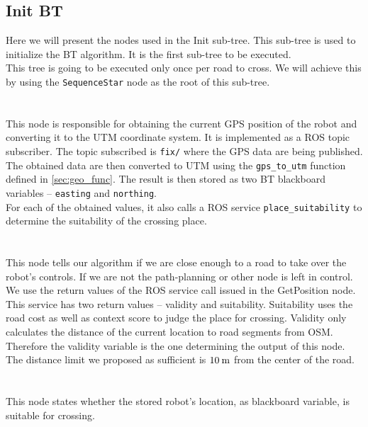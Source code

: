 \subsection{Init BT}
\label{sec:Init-BT-impl}
    Here we will present the nodes used in the Init sub-tree. This sub-tree is used to initialize the BT algorithm. It is the first sub-tree to be executed.\\
    This tree is going to be executed only once per road to cross. We will achieve this by using the \texttt{SequenceStar} node as the root of this sub-tree.\\\\
    \\
        This node is responsible for obtaining the current GPS position of the robot and converting it to the UTM coordinate system. It is implemented as a ROS topic subscriber. The topic subscribed is \texttt{fix/} where the GPS data are being published.\\
        The obtained data are then converted to UTM using the \texttt{gps\_to\_utm} function defined in \ref{sec:geo_func}. The result is then stored as two BT blackboard variables -- \texttt{easting} and \texttt{northing}.\\
        For each of the obtained values, it also calls a ROS service \texttt{place\_suitability} to determine the suitability of the crossing place.\\\\
    \\
        This node tells our algorithm if we are close enough to a road to take over the robot's controls. If we are not the path-planning or other node is left in control.\\
        We use the return values of the ROS service call issued in the GetPosition node. This service has two return values -- validity and suitability. Suitability uses the road cost as well as context score to judge the place for crossing. Validity only calculates the distance of the current location to road segments from OSM.\\
        Therefore the validity variable is the one determining the output of this node. The distance limit we proposed as sufficient is $10\:\rm{m}$ from the center of the road.\\\\
    \\
        This node states whether the stored robot's location, as blackboard variable, is suitable for crossing.\\

